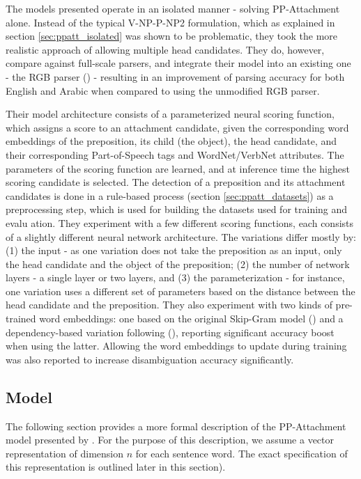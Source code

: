 The models presented operate in an isolated manner - solving PP-Attachment alone. Instead of the typical V-NP-P-NP2 formulation, which as explained in section \ref{sec:ppatt_isolated} was shown to be problematic, they took the more realistic approach of allowing multiple head candidates. They do, however, compare against full-scale parsers, and integrate their model into an existing one - the RGB parser (\cite{lei-etal-14-low}) - resulting in an improvement of parsing accuracy for both English and Arabic when compared to using the unmodified RGB parser.

Their model architecture consists of a parameterized neural scoring function, which assigns a score to an attachment candidate, given the corresponding word embeddings of the preposition, its child (the object), the head candidate, and their corresponding Part-of-Speech tags and WordNet/VerbNet attributes. The parameters of the scoring function are learned, and at inference time the highest scoring candidate is selected. The detection of a preposition and its attachment candidates is done in a rule-based process (section \ref{sec:ppatt_datasets}) as a preprocessing step, which is used for building the datasets used for training and evalu
ation. They experiment with a few different scoring functions, each consists of a slightly different neural network architecture. The variations differ mostly by: (1)  the input - as one variation does not take the preposition as an input, only the head candidate and the object of the preposition; (2) the number of network layers - a single layer or two layers, and (3) the parameterization - for instance, one variation uses a different set of parameters based on the distance between the head candidate and the preposition. They also experiment with two kinds of pre-trained word embeddings: one based on the original Skip-Gram model (\cite{word2vec}) and a dependency-based variation following (\cite{bansal}), reporting significant accuracy boost when using the latter. Allowing the word embeddings to update during training was also reported to increase disambiguation accuracy significantly. 

\subsection{Model}
The following section provides a more formal description of the PP-Attachment model presented by \cite{hpcd}. For the purpose of this description, we assume a vector representation of dimension $n$ for each sentence word. The exact specification of this representation is outlined later in this section).

